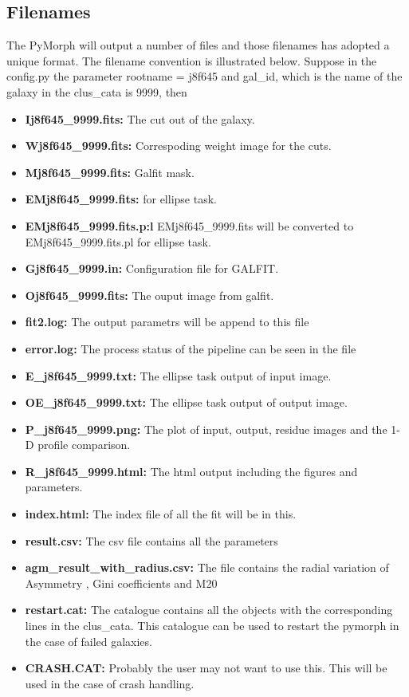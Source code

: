 \documentclass[a4paper,12pt]{article}
\begin{document}
\subsection{Filenames}
The PyMorph will output a number of files and those filenames has adopted a unique format. The filename convention is illustrated below. Suppose in the config.py the parameter rootname = j8f645 and gal\_id, which is the name of the galaxy in the clus\_cata is 9999, then
\begin{itemize}
\item \textbf{Ij8f645\_9999.fits:} The cut out of the galaxy.
\item \textbf{Wj8f645\_9999.fits:} Correspoding weight image for the cuts.
\item \textbf{Mj8f645\_9999.fits:} Galfit mask.
\item \textbf{EMj8f645\_9999.fits:} for ellipse task.
\item \textbf{EMj8f645\_9999.fits.p:l} EMj8f645\_9999.fits will be converted to EMj8f645\_9999.fits.pl for
 ellipse task.
\item \textbf{Gj8f645\_9999.in:} Configuration file for GALFIT.
\item \textbf{Oj8f645\_9999.fits:} The ouput image from galfit.
\item \textbf{fit2.log:} The output parametrs will be append to this file
\item \textbf{error.log:} The process status of the pipeline can be seen in the file
\item \textbf{E\_j8f645\_9999.txt:} The ellipse task output of input image.
\item \textbf{OE\_j8f645\_9999.txt:} The ellipse task output of output image.
\item \textbf{P\_j8f645\_9999.png:} The plot of input, output, residue images and the 1-D profile comparison.
\item \textbf{R\_j8f645\_9999.html:} The html output including the figures and parameters.
\item \textbf{index.html:} The index file of all the fit will be in this.
\item \textbf{result.csv:} The csv file contains all the parameters
\item \textbf{agm\_result\_with\_radius.csv:} The file contains the radial variation of Asymmetry , Gini coefficients and M20
\item \textbf{restart.cat:} The catalogue contains all the objects with the corresponding lines in the clus\_cata. This catalogue can be used to restart the pymorph in the case of failed galaxies.
\item \textbf{CRASH.CAT:} Probably the user may not want to use this. This will be used in the case of crash handling.
\end{itemize}
\end{document}
